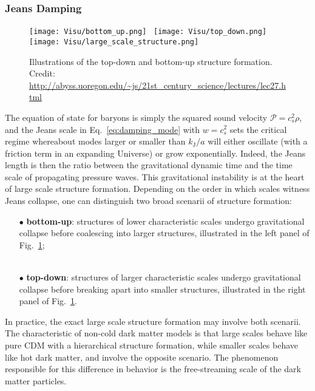 \subsubsection*{Jeans Damping}

\begin{figure}
\begin{center}
\texttt{[image: Visu/bottom\_up.png]}~%
\texttt{[image: Visu/top\_down.png]}
\texttt{[image: Visu/large\_scale\_structure.png]}
\caption{Illustrations of the top-down and bottom-up structure formation. Credit: \url{http://abyss.uoregon.edu/~js/21st_century_science/lectures/lec27.html}}
\label{fig:lss_hdm_cdm}
\end{center}
\end{figure}

The equation of state for baryons is simply the squared sound velocity $\mathcal{P} = c^2_s \rho$, and the Jeans scale in Eq.~\ref{eq:damping_mode} with $w=c^2_s$ sets the critical regime whereabout modes larger or smaller than $k_{\mathrm{J}}/a$ will either oscillate (with a friction term in an expanding Universe) or grow exponentially. Indeed, the Jeans length is then the ratio between the gravitational dynamic time and the time scale of propagating pressure waves. This gravitational instability is at the heart of large scale structure formation. Depending on the order in which scales witness Jeans collapse, one can distinguish two broad scenarii of structure formation:\\

\begin{itemize}
\item[$\bullet$] \textbf{bottom-up}: structures of lower characteristic scales undergo gravitational collapse before coalescing into larger structures, illustrated in the left panel of Fig.~\ref{fig:lss_hdm_cdm};\\
\\
\item[$\bullet$] \textbf{top-down}: structures of larger characteristic scales undergo gravitational collapse before breaking apart into smaller structures, illustrated in the right panel of Fig.~\ref{fig:lss_hdm_cdm}.\\
\end{itemize}

In practice, the exact large scale structure formation may involve both scenarii. The characteristic of non-cold dark matter models is that large scales behave like pure CDM with a hierarchical structure formation, while smaller scales behave like hot dark matter, and involve the opposite scenario. The phenomenon responsible for this difference in behavior is the free-streaming  scale of the dark matter particles.

